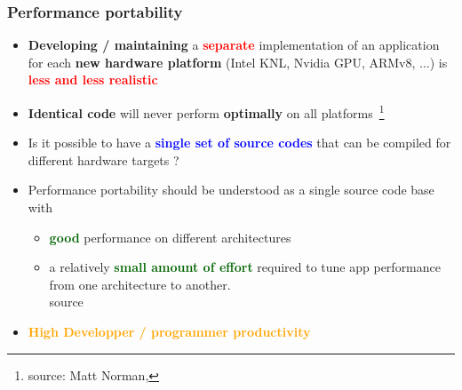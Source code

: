 \begin{frame}
  \frametitle{Performance portability}

  \begin{itemize}
  \item \textbf{Developing / maintaining} a \textcolor{red}{\textbf{separate}} implementation of an application for each \textbf{new hardware platform} (Intel KNL, Nvidia GPU, ARMv8, ...) is \textcolor{red}{\textbf{less and less realistic}}
  \item \textbf{Identical code} will never perform \textbf{optimally} on all platforms~\footnote{source: Matt Norman, }
  \item Is it possible to have a \textcolor{blue}{\textbf{single set of source codes}} that can be compiled for different hardware targets ?
  \item Performance portability should be understood as a single source code base with
    \begin{itemize}
    \item \textcolor{darkgreen}{\textbf{good}} performance on different architectures
    \item a relatively \textcolor{darkgreen}{\textbf{small amount of effort}} required to tune app performance from one architecture to another.\\
      {\tiny source }
    \end{itemize}
  \item \textcolor{orange}{\textbf{High Developper / programmer productivity}}
  \end{itemize}

\end{frame}

